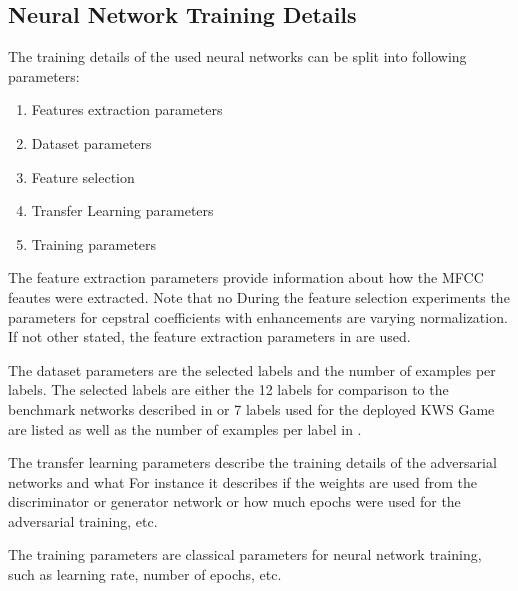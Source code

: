 \subsection{Neural Network Training Details}\label{sec:exp_details_training}
The training details of the used neural networks can be split into following parameters:
\begin{enumerate}
  \item Features extraction parameters
  \item Dataset parameters
  \item Feature selection
  \item Transfer Learning parameters
  \item Training parameters
\end{enumerate}
The feature extraction parameters provide information about how the MFCC feautes were extracted.
Note that no
During the feature selection experiments the parameters for cepstral coefficients with enhancements are varying normalization.
If not other stated, the feature extraction parameters in  are used.

The dataset parameters are the selected labels and the number of examples per labels.
The selected labels are either the 12 labels for comparison to the benchmark networks described in  or 7 labels used for the deployed KWS Game are listed as well as the number of examples per label in .

The transfer learning parameters describe the training details of the adversarial networks and what
For instance it describes if the weights are used from the discriminator or generator network or how much epochs were used for the adversarial training, etc.
%

The training parameters are classical parameters for neural network training, such as learning rate, number of epochs, etc.
%

